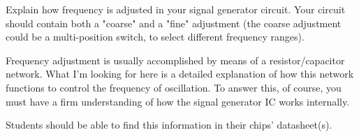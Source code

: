 

Explain how frequency is adjusted in your signal generator circuit.  Your circuit should contain both a "coarse" and a "fine" adjustment (the coarse adjustment could be a multi-position switch, to select different frequency ranges).







Frequency adjustment is usually accomplished by means of a resistor/capacitor network.  What I'm looking for here is a detailed explanation of how this network functions to control the frequency of oscillation.  To answer this, of course, you must have a firm understanding of how the signal generator IC works internally.







Students should be able to find this information in their chips' datasheet(s).




